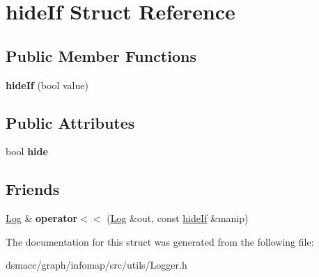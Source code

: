 \hypertarget{structhideIf}{}\section{hide\+If Struct Reference}
\label{structhideIf}
\subsection*{Public Member Functions}
\begin{DoxyCompactItemize}
\item 
\mbox{\label{structhideIf_ad4e8bfbb6e2ef47cdce2929f751d9b80}} 
{\bfseries hide\+If} (bool value)
\end{DoxyCompactItemize}
\subsection*{Public Attributes}
\begin{DoxyCompactItemize}
\item 
\mbox{\label{structhideIf_a8c595fd874d9d24a0b4adc77937b6dea}} 
bool {\bfseries hide}
\end{DoxyCompactItemize}
\subsection*{Friends}
\begin{DoxyCompactItemize}
\item 
\mbox{\label{structhideIf_a5f6a9e97b821cb22eeae854abf1aa4c0}} 
\mbox{\hyperlink{classLog}{Log}} \& {\bfseries operator$<$$<$} (\mbox{\hyperlink{classLog}{Log}} \&out, const \mbox{\hyperlink{structhideIf}{hide\+If}} \&manip)
\end{DoxyCompactItemize}


The documentation for this struct was generated from the following file\+:\begin{DoxyCompactItemize}
\item 
dsmacc/graph/infomap/src/utils/Logger.\+h\end{DoxyCompactItemize}
